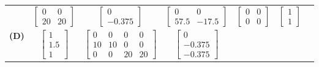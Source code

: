 \begin{sidewaystable}
{\begin{tabular}{c c c c c c c}
			& $\displaystyle \begin{bmatrix}

				0 & 0 \\

				20 & 20 \end{bmatrix}$

			& $\displaystyle \begin{bmatrix}

				0 \\

				-0.375
			\end{bmatrix}$

			& $\displaystyle \begin{bmatrix}

				0 & 0 \\

				57.5 & -17.5
			\end{bmatrix}$

			& $\displaystyle \begin{bmatrix} 0 & 0 \\ 0 & 0 \end{bmatrix}$

			& $\displaystyle \begin{bmatrix} 1 \\ 1 \end{bmatrix}$\\[1em]
			\textbf{(D)} 

			& $\displaystyle \begin{bmatrix}

				1 \\

				1.5\\

				1
			\end{bmatrix}$

			& $\displaystyle \begin{bmatrix}

				0 & 0 & 0 & 0 \\

				10 & 10 & 0 & 0 \\

				0 & 0 & 20 & 20 \end{bmatrix}$

			& $\displaystyle \begin{bmatrix}

				0 \\ -0.375 \\ -0.375
			\end{bmatrix}$


\end{tabular}}
\end{sidewaystable}
